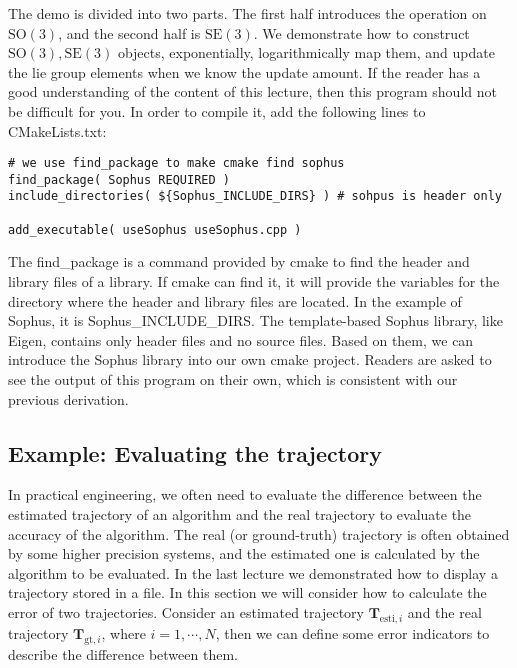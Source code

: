 The demo is divided into two parts. The first half introduces the operation on $\mathrm{SO}(3)$, and the second half is $\mathrm{SE}(3)$. We demonstrate how to construct $\mathrm{SO}(3), \mathrm{SE}(3)$ objects, exponentially, logarithmically map them, and update the lie group elements when we know the update amount. If the reader has a good understanding of the content of this lecture, then this program should not be difficult for you. In order to compile it, add the following lines to CMakeLists.txt:

\begin{lstlisting}[caption=slambook/ch4/useSophus/CMakeLists.txt]
# we use find_package to make cmake find sophus
find_package( Sophus REQUIRED )
include_directories( ${Sophus_INCLUDE_DIRS} ) # sohpus is header only

add_executable( useSophus useSophus.cpp )
\end{lstlisting}

The find\_package is a command provided by cmake to find the header and library files of a library. If cmake can find it, it will provide the variables for the directory where the header and library files are located. In the example of Sophus, it is Sophus\_INCLUDE\_DIRS. The template-based Sophus library, like Eigen, contains only header files and no source files. Based on them, we can introduce the Sophus library into our own cmake project. Readers are asked to see the output of this program on their own, which is consistent with our previous derivation.

\subsection{Example: Evaluating the trajectory}
In practical engineering, we often need to evaluate the difference between the estimated trajectory of an algorithm and the real trajectory to evaluate the accuracy of the algorithm. The real (or ground-truth) trajectory is often obtained by some higher precision systems, and the estimated one is calculated by the algorithm to be evaluated. In the last lecture we demonstrated how to display a trajectory stored in a file. In this section we will consider how to calculate the error of two trajectories. Consider an estimated trajectory $\mathbf{T}_{\mathrm{esti}, i}$ and the real trajectory $\mathbf{T}_{\mathrm{gt},i}$, where $i=1,\cdots , N$, then we can define some error indicators to describe the difference between them.


